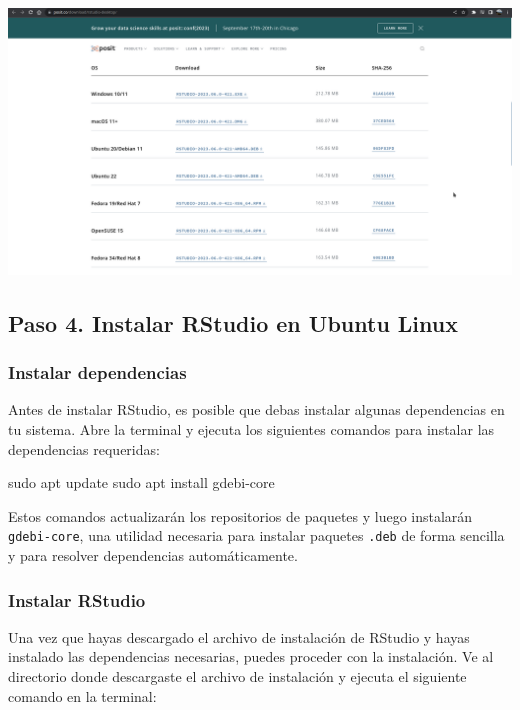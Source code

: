 \documentclass[
  a4paper,
]{article}
\newenvironment{Shaded}{}{}
\newcommand{\FunctionTok}[1]{\textcolor[rgb]{0.44,0.26,0.76}{#1}}
\newcommand{\NormalTok}[1]{\textcolor[rgb]{0.14,0.16,0.18}{#1}}
\begin{document}
\includegraphics{images/Screenshot_20230610_224818.png}

\hypertarget{paso-4.-instalar-rstudio-en-ubuntu-linux}{%
\subsection{Paso 4. Instalar RStudio en Ubuntu
Linux}\label{paso-4.-instalar-rstudio-en-ubuntu-linux}}

\hypertarget{instalar-dependencias}{%
\subsubsection{Instalar dependencias}\label{instalar-dependencias}}

Antes de instalar RStudio, es posible que debas instalar algunas
dependencias en tu sistema. Abre la terminal y ejecuta los siguientes
comandos para instalar las dependencias requeridas:

\begin{Shaded}
\begin{Highlighting}[]
\FunctionTok{sudo}\NormalTok{ apt update}
\FunctionTok{sudo}\NormalTok{ apt install gdebi{-}core}
\end{Highlighting}
\end{Shaded}

Estos comandos actualizarán los repositorios de paquetes y luego
instalarán \texttt{gdebi-core}, una utilidad necesaria para instalar
paquetes \texttt{.deb} de forma sencilla y para resolver dependencias
automáticamente.

\hypertarget{instalar-rstudio}{%
\subsubsection{Instalar RStudio}\label{instalar-rstudio}}

Una vez que hayas descargado el archivo de instalación de RStudio y
hayas instalado las dependencias necesarias, puedes proceder con la
instalación. Ve al directorio donde descargaste el archivo de
instalación y ejecuta el siguiente comando en la terminal:
\end{document}
